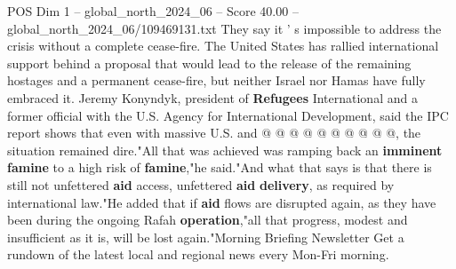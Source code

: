 \begin{textsample}{POS Dim 1 – global\_north\_2024\_06 – Score 40.00 – global\_north\_2024\_06/109469131.txt}
They say it ' s impossible to address the crisis without a complete cease-fire.
The United States has rallied international support behind a proposal that would lead to the release of the remaining hostages and a permanent cease-fire, but neither Israel nor Hamas have fully embraced it.
Jeremy Konyndyk, president of \textbf{Refugees} International and a former official with the U.S.
Agency for International Development, said the IPC report shows that even with massive U.S. and @ @ @ @ @ @ @ @ @ @, the situation remained dire."All that was achieved was ramping back an \textbf{imminent} \textbf{famine} to a high risk of \textbf{famine},"he said."And what that says is that there is still not unfettered \textbf{aid} access, unfettered \textbf{aid} \textbf{delivery}, as required by international law."He added that if \textbf{aid} flows are disrupted again, as they have been during the ongoing Rafah \textbf{operation},"all that progress, modest and insufficient as it is, will be lost again."Morning Briefing Newsletter Get a rundown of the latest local and regional news every Mon-Fri morning.

\end{textsample}
